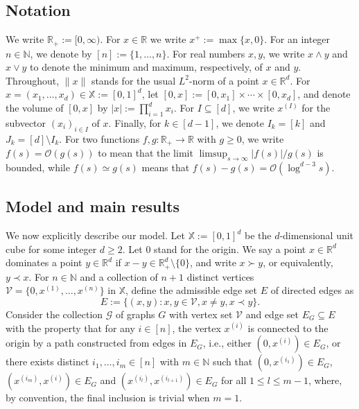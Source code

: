 \documentclass[11pt,reqno]{amsart}
\numberwithin{equation}{section}
\theoremstyle{definition}
\newcommand{\R}{\mathbb{R}}
\newcommand{\N}{\mathbb{N}}
\newcommand{\XX}{\mathbb{X}}
\begin{document}
\subsection{Notation} We write $\R_+:=[0,\infty)$. For $x \in \R$ we write $x^+:=\max\{x,0\}$. For an integer $n \in \N$, we denote by $[n]:=\{1,\dots,n\}$. For real numbers $x ,y$, we write $x\wedge y$ and $x\vee y$ to denote the minimum and maximum, respectively, of $x$ and $y$. Throughout, $\|x\|$ stands for the usual $L^2$-norm of a point $x \in \R^d$. For $x=(x_1,\dots,x_d)\in \XX:=[0,1]^d$, let
$[0,x]:=[0,x_1] \times\cdots\times [0,x_d]$, and denote the
volume of $[0,x]$ by
$
	|x|:=\prod_{i=1}^d x_i
$.
For $I \subseteq [d]$, we write $x^{(I)}$ for the subvector $(x_i)_{i \in I}$ of $x$. Finally, for $k \in [d-1]$, we denote $I_k=[k]$ and $J_k=[d] \setminus I_k$. For two functions $f,g:\R_+ \to \R$ with $g \ge 0$, we write $f(s)=\mathcal{O}(g(s))$ to mean that the limit $\limsup_{s \to \infty} |f(s)|/g(s)$ is bounded, while $f(s) \simeq g(s)$ means that $f(s)-g(s)=\mathcal{O}(\log^{d-3} s)$.

\subsection{Model and main results}
We now explicitly describe our model. Let $\XX:=[0,1]^d$ be the $d$-dimensional unit cube for some integer $d \ge 2$. Let $0$ stand for the origin. We say a point
$x \in \R^d$ dominates a point $y \in \R^d$ if
$x-y\in \R_+^d\setminus\{0\}$, and write $x\succ y$, or equivalently, $y \prec x$. For $n \in \N$ and a collection of $n+1$ distinct vertices $\mathcal{V}=\{0,x^{(1)}, \dots, x^{(n)}\}$ in $\XX$, define the admissible edge set $E$ of directed edges as
$$
E:= \{(x,y): x, y \in \mathcal{V}, x\not=y, x \prec y\}.
$$
Consider the collection $\mathscr{G}$ of graphs $G$ with vertex set $\mathcal{V}$ and edge set $E_G \subseteq E$ with the property that for any $i \in [n]$, the vertex $x^{(i)}$ is connected to the origin by a path constructed from edges in $E_G$, i.e., either $(0,x^{(i)}) \in E_G$, or there exists distinct $i_1, \dots, i_m \in [n]$ with $m\in \N$ such that $(0,x^{(i_1)}) \in E_G$, $(x^{(i_m)},x^{(i)}) \in E_G$ and $(x^{(i_l)}, x^{(i_{l+1})}) \in E_G$ for all $1 \le l \le m-1$, where, by convention, the final inclusion is trivial when $m=1$.  
\end{document}
